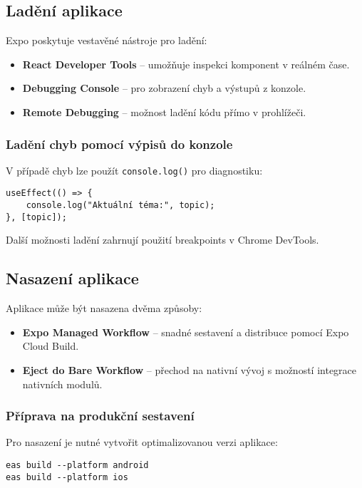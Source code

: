\documentclass[a4paper,12pt]{article}
\begin{document}
\subsection{Ladění aplikace}

Expo poskytuje vestavěné nástroje pro ladění:
\begin{itemize}
    \item \textbf{React Developer Tools} – umožňuje inspekci komponent v reálném čase.
    \item \textbf{Debugging Console} – pro zobrazení chyb a výstupů z konzole.
    \item \textbf{Remote Debugging} – možnost ladění kódu přímo v prohlížeči.
\end{itemize}

\subsubsection{Ladění chyb pomocí výpisů do konzole}

V případě chyb lze použít \texttt{console.log()} pro diagnostiku:

\begin{verbatim}
useEffect(() => {
    console.log("Aktuální téma:", topic);
}, [topic]);
\end{verbatim}

Další možnosti ladění zahrnují použití breakpoints v Chrome DevTools.

\subsection{Nasazení aplikace}

Aplikace může být nasazena dvěma způsoby:
\begin{itemize}
    \item \textbf{Expo Managed Workflow} – snadné sestavení a distribuce pomocí Expo Cloud Build.
    \item \textbf{Eject do Bare Workflow} – přechod na nativní vývoj s možností integrace nativních modulů.
\end{itemize}

\subsubsection{Příprava na produkční sestavení}

Pro nasazení je nutné vytvořit optimalizovanou verzi aplikace:

\begin{verbatim}
eas build --platform android
eas build --platform ios
\end{verbatim}
\end{document}
